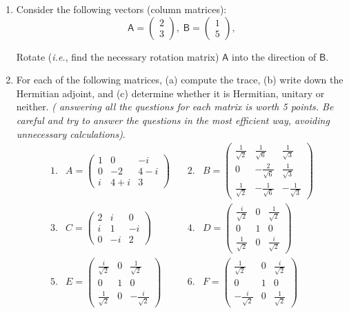 \documentclass{article}
\begin{document}
\begin{enumerate}
\item  Consider the following vectors (column matrices):
\[
\mathsf{A}=\left( 
\begin{array}{l}
2 \\ 
3
\end{array}
\right) ,\;\mathsf{B}=\left( 
\begin{array}{l}
1 \\ 
5
\end{array}
\right) ,
\]

Rotate ({\it i.e.}, find the necessary rotation matrix) $\mathsf{A}$ into the direction of $\mathsf{B}$.




\item  For each of the following matrices, (a) compute the trace, (b) write down the Hermitian adjoint, and (c) determine whether it is Hermitian, unitary or neither. \emph{( answering all the questions for each matrix is worth 5 points. Be careful and try to answer the questions in the most efficient way, avoiding unnecessary calculations)}. 
\[
\begin{array}{ccccc}
1. & A=\left( 
\begin{array}{ccc}
1 & 0 & -i \\ 
0 & -2 & 4-i \\ 
i & 4+i & 3
\end{array}
\right)  & \, & 2. & B=\left( 
\begin{array}{ccc}
\frac{1}{\sqrt{2}} & \frac{1}{\sqrt{6}} & \frac{1}{\sqrt{3}} \\ 
0 & -\frac{2}{\sqrt{6}} & \frac{1}{\sqrt{3}} \\ 
\frac{1}{\sqrt{2}} & -\frac{1}{\sqrt{6}} & -\frac{1}{\sqrt{3}}
\end{array}
\right)  \\ 
3. & C=\left( 
\begin{array}{lll}
2 & i & 0 \\ 
i & 1 & -i \\ 
0 & -i & 2
\end{array}
\right)  & \, & 4. & D=\left( 
\begin{array}{ccc}
\frac{i}{\sqrt{2}} & 0 & \frac{1}{\sqrt{2}} \\ 
0 & 1 & 0 \\ 
\frac{1}{\sqrt{2}} & 0 & \frac{i}{\sqrt{2}}
\end{array}
\right)  \\ 
5. & E=\left( 
\begin{array}{ccc}
\frac{i}{\sqrt{2}} & 0 & \frac{1}{\sqrt{2}} \\ 
0 & 1 & 0 \\ 
\frac{1}{\sqrt{2}} & 0 & -\frac{i}{\sqrt{2}}
\end{array}
\right)  & \, & 6. & F=\left( 
\begin{array}{ccc}
\frac{1}{\sqrt{2}} & 0 & \frac{i}{\sqrt{2}} \\ 
0 & 1 & 0 \\ 
-\frac{i}{\sqrt{2}} & 0 & \frac{1}{\sqrt{2}}
\end{array}
\right) 
\end{array}
\]



\end{enumerate}
\end{document}
